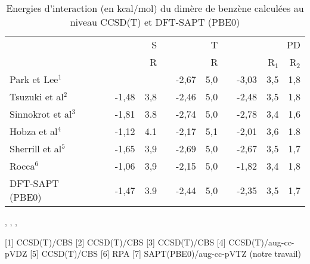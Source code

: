 	\begin{table}[H]
		\caption{Energies d'interaction (en kcal/mol) du dimère de benzène calculées au niveau CCSD(T) et DFT-SAPT (PBE0)}
		\begin{center}
			\begin{tabular}{l c r r r c r r c r r r}
				\toprule
				& & & \multicolumn{2}{p{2cm}}{\centering S}  &	& \multicolumn{2}{p{2cm}}{\centering
					T}& &\multicolumn{3}{p{3cm}}{\centering PD}\\
				\cline{4-12}
				& & & & R & &  &  R & & & R$_{1}$ & R$_{2}$ \\
				\midrule
				Park et Lee$^{1}$ & & & &  & &-2,67& 5,0 & &-3,03 & 3,5 & 1,8\\
				Tsuzuki et al$^{2}$ & & & -1,48& 3,8 &  &-2,46& 5,0&  & -2,48 & 3,5& 1,8\\
				Sinnokrot et al$^{3}$ & & & -1,81 & 3.8 & &-2,74& 5,0&  & -2,78 & 3,4 & 1,6\\
				Hobza et al$^{4}$ & & &-1,12 & 4.1 &  &-2,17& 5,1& & -2,01 & 3,6 & 1.8\\
				Sherrill et al$^{5}$& &  & -1,65 & 3,9 & & -2,69& 5,0 & & -2,67 & 3,5 & 1,7 \\
				Rocca$^{6}$ & & & -1,06& 3,9& & -2,15& 5,0 & & -1,82 & 3,4 & 1,8\\ 
				DFT-SAPT (PBE0) & & & -1,47 & 3.9 &  &-2,44 &5,0& & -2,35& 3,5 &1,7\\
				\bottomrule
			\end{tabular}
		\end{center}
		\centering
		,
		,
		,
		
		[1] CCSD(T)/CBS
		[2] CCSD(T)/CBS 
		[3] CCSD(T)/CBS
		[4] CCSD(T)/aug-cc-pVDZ
		[5] CCSD(T)/CBS 
		[6] RPA
		[7] SAPT(PBE0)/aug-cc-pVTZ (notre travail)
		
		\label{benzene}
	\end{table}
	
	
	
	
	
	
	
	
	
	
	
	\newpage
